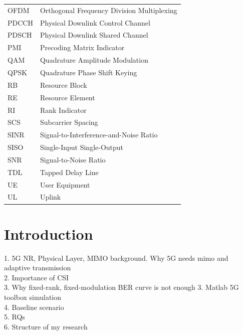 \documentclass[a4paper,12pt,onecolumn]{article}
\begin{document}
\begin{longtable}{p{3cm}p{10cm}}
	OFDM    & Orthogonal Frequency Division Multiplexing \\
	
	PDCCH   & Physical Downlink Control Channel \\
	PDSCH   & Physical Downlink Shared Channel \\
	PMI     & Precoding Matrix Indicator \\

	
	QAM     & Quadrature Amplitude Modulation \\
	QPSK    & Quadrature Phase Shift Keying \\
	
	RB      & Resource Block \\
	RE      & Resource Element \\
	RI      & Rank Indicator \\
	
	SCS     & Subcarrier Spacing \\
	SINR    & Signal-to-Interference-and-Noise Ratio \\
	SISO    & Single-Input Single-Output \\
	SNR     & Signal-to-Noise Ratio \\
	

	TDL     & Tapped Delay Line \\
	
	UE      & User Equipment \\
	UL      & Uplink \\
	
\end{longtable}
\newpage

\section{Introduction}

1. 5G NR, Physical Layer, MIMO background. Why 5G needs mimo and adaptive transmission \\
2. Importance of CSI\\
3. Why fixed-rank, fixed-modulation BER curve is not enough
3. Matlab 5G toolbox simulation\\
4. Baseline scenario \\
5. RQs\\
6. Structure of my research\\
\end{document}

